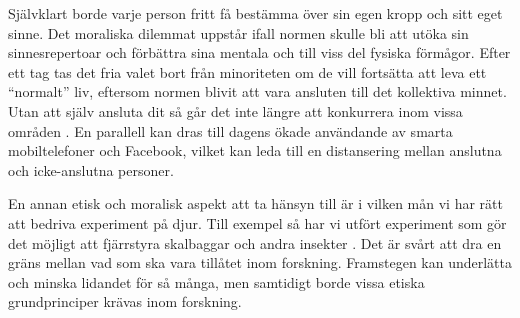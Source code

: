 \documentclass[12pt, a4paper]{article}
\begin{document}
Självklart borde varje person fritt få bestämma över sin egen kropp och sitt eget sinne. Det moraliska dilemmat uppstår ifall normen skulle bli att utöka sin sinnesrepertoar och förbättra sina mentala och till viss del fysiska förmågor. Efter ett tag tas det fria valet bort från minoriteten om de vill fortsätta att leva ett ``normalt'' liv, eftersom normen blivit att vara ansluten till det kollektiva minnet. Utan att själv ansluta dit så går det inte längre att konkurrera inom vissa områden \cite{ethics_eu,ethics1}. En parallell kan dras till dagens ökade användande av smarta mobiltelefoner och Facebook, vilket kan leda till en distansering mellan anslutna och icke-anslutna personer.

En annan etisk och moralisk aspekt att ta hänsyn till är i vilken mån vi har rätt att bedriva experiment på djur. Till exempel så har vi utfört experiment som gör det möjligt att fjärrstyra skalbaggar och andra insekter \cite{ethics2}. Det är svårt att dra en gräns mellan vad som ska vara tillåtet inom forskning. Framstegen kan underlätta och minska lidandet för så många, men samtidigt borde vissa etiska grundprinciper krävas inom forskning.







%
%




\pagebreak


\end{document}
